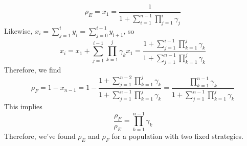 \begin{equation}
  \rho_E = x_1 = \frac{1}{1 + \sum_{i=1}^{n-1} \prod_{j=1}^i \gamma_j}
  \label{eq:comm_fixation_prob}
\end{equation}
Likewise, $x_i = \sum_{j=1}^i y_i = \sum_{j=0}^{i-1} y_{i+1}$, so
\begin{equation*}
  x_i
  = x_1 + \sum_{j=1}^{i-1} \prod_{k=1}^j \gamma_k x_1
  = \frac{1 + \sum_{j=1}^{i-1} \prod_{k=1}^j \gamma_k}
    {1 + \sum_{j=1}^{n-1} \prod_{k=1}^j \gamma_k}
\end{equation*}
Therefore, we find
\begin{equation*}
  \rho_F = 1 - x_{n-1}
  = 1 - \frac{1 + \sum_{j=1}^{n-2} \prod_{k=1}^j \gamma_k}
    {1 + \sum_{j=1}^{n-1} \prod_{k=1}^j \gamma_k}
  = \frac{\prod_{k=1}^{n-1} \gamma_k}{1 + \sum_{j=1}^{n-1} \prod_{k=1}^j \gamma_k}
\end{equation*}
This implies
\begin{equation}
  \frac{\rho_F}{\rho_E} = \prod_{k=1}^{n-1} \gamma_k
  \label{eq:fixation_prob_ratio}
\end{equation}
Therefore, we've found $\rho_E$ and $\rho_F$ for a population
with two fixed strategies.

